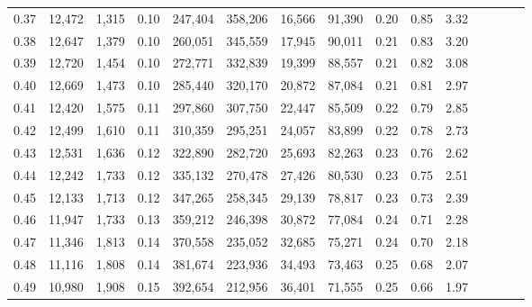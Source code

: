 \begin{tabular}{rrrcrrrrrrrrrrr}
0.37 &  12,472 &  1,315 &                                       0.10 &  247,404 &  358,206 &   16,566 &   91,390 &  0.20 &  0.85 &                         3.32 \\
0.38 &  12,647 &  1,379 &                                       0.10 &  260,051 &  345,559 &   17,945 &   90,011 &  0.21 &  0.83 &                         3.20 \\
0.39 &  12,720 &  1,454 &                                       0.10 &  272,771 &  332,839 &   19,399 &   88,557 &  0.21 &  0.82 &                         3.08 \\
0.40 &  12,669 &  1,473 &                                       0.10 &  285,440 &  320,170 &   20,872 &   87,084 &  0.21 &  0.81 &                         2.97 \\
0.41 &  12,420 &  1,575 &                                       0.11 &  297,860 &  307,750 &   22,447 &   85,509 &  0.22 &  0.79 &                         2.85 \\
0.42 &  12,499 &  1,610 &                                       0.11 &  310,359 &  295,251 &   24,057 &   83,899 &  0.22 &  0.78 &                         2.73 \\
0.43 &  12,531 &  1,636 &                                       0.12 &  322,890 &  282,720 &   25,693 &   82,263 &  0.23 &  0.76 &                         2.62 \\
0.44 &  12,242 &  1,733 &                                       0.12 &  335,132 &  270,478 &   27,426 &   80,530 &  0.23 &  0.75 &                         2.51 \\
0.45 &  12,133 &  1,713 &                                       0.12 &  347,265 &  258,345 &   29,139 &   78,817 &  0.23 &  0.73 &                         2.39 \\
0.46 &  11,947 &  1,733 &                                       0.13 &  359,212 &  246,398 &   30,872 &   77,084 &  0.24 &  0.71 &                         2.28 \\
0.47 &  11,346 &  1,813 &                                       0.14 &  370,558 &  235,052 &   32,685 &   75,271 &  0.24 &  0.70 &                         2.18 \\
0.48 &  11,116 &  1,808 &                                       0.14 &  381,674 &  223,936 &   34,493 &   73,463 &  0.25 &  0.68 &                         2.07 \\
0.49 &  10,980 &  1,908 &                                       0.15 &  392,654 &  212,956 &   36,401 &   71,555 &  0.25 &  0.66 &                         1.97 \\

\end{tabular}
